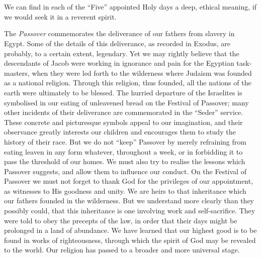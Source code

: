 \chapter{}

We can find in each of the “Five” appointed
Holy days a deep, ethical meaning, if we
would seek it in a reverent spirit.

The \textsl{Passover} commemorates the deliverance
of our fathers from slavery in Egypt.
Some of the details of this deliverance, as
recorded in Exodus, are probably, to a certain
extent, legendary. Yet we may rightly believe
that the descendants of Jacob were working in
ignorance and pain for the Egyptian task-masters,
when they were led forth to the wilderness
where Judaism was founded as a national
religion. Through this religion, thus founded,
all the nations of the earth were ultimately to
be blessed. The hurried departure of the
Israelites is symbolised in our eating of unleavened
bread on the Festival of Passover;
many other incidents of their deliverance
are commemorated in the “Seder” service.
These concrete and picturesque symbols
appeal to our imagination, and their observance
greatly interests our children and
encourages them to study the history of
their race. But we do not “keep” Passover
by merely refraining from eating leaven in
any form whatever, throughout a week, or
in forbidding it to pass the threshold of our
homes. We must also try to realise the
lessons which Passover suggests, and allow
them to influence our conduct. On the
Festival of Passover we must not forget to
thank God for the privileges of our appointment,
as witnesses to His goodness and
unity. We are heirs to that inheritance
which our fathers founded in the wilderness.
But we understand more clearly than they
possibly could, that this inheritance is one
involving work and self-sacrifice. They
were told to obey the precepts of the law,
in order that their days might be prolonged
in a land of abundance. We have learned
that our highest good is to be found in
works of righteousness, through which the
spirit of God may be revealed to the world.
Our religion has passed to a broader and
more universal stage.

